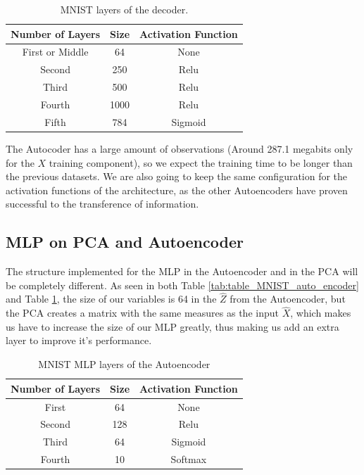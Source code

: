 \begin{table}[H]
	\caption{MNIST layers of the decoder.}
	\begin{center}
		\label{tab:table_MNIST_auto_decoder}
		\begin{tabular}{c|c|c} %
			\textbf{Number of Layers} & \textbf{Size} & \textbf{Activation Function} \\
			\hline
			First or Middle & 64 & None\\
			Second & 250 & Relu\\
			Third & 500  & Relu\\
			Fourth & 1000 & Relu\\
			Fifth & 784 & Sigmoid \\
		\end{tabular}
	\end{center}
\end{table}

The Autocoder has a large amount of observations (Around 287.1 megabits only for the $X$ training component), so we expect the training time to be longer than the previous datasets. We are also going to keep the same configuration for the activation functions of the architecture, as the other Autoencoders  have proven successful to the transference of information.

\subsection{MLP on PCA and Autoencoder}

The structure implemented for the MLP in the Autoencoder and in the PCA will be completely different. As seen in both Table \ref{tab:table_MNIST_auto_encoder} and Table \ref{tab:table_MNIST_auto_decoder}, the size of our variables is 64 in the $\hat{Z}$ from the Autoencoder, but the PCA creates a matrix with the same measures as the input $\hat{X}$, which makes us have to increase the size of our MLP greatly, thus making us add an extra layer to improve it's performance.
\par	

\begin{table}[H]
	\caption{MNIST MLP layers of the Autoencoder}
	\begin{center}
		\label{tab:table_MNIST_MLP_auto}
		\begin{tabular}{c|c|c} %
			\textbf{Number of Layers} & \textbf{Size} & \textbf{Activation Function} \\
			\hline
			First & 64 & None\\
			Second & 128 & Relu\\
			Third & 64  & Sigmoid\\
			Fourth & 10 & Softmax\\
		\end{tabular}
	\end{center}
\end{table}

